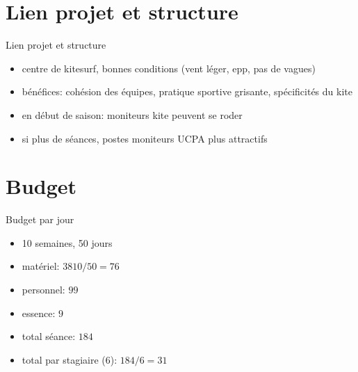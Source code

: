 \documentclass[10pt,a4paper]{beamer}
\begin{document}
\section{Lien projet et structure}
\begin{frame}{Lien projet et structure}
\begin{itemize}
\item  centre de kitesurf, bonnes conditions (vent léger, epp, pas de vagues)
\item bénéfices: cohésion des équipes, pratique sportive grisante, spécificités du kite
\item en début de saison:  moniteurs kite peuvent se roder
\item si plus de séances,  postes moniteurs UCPA plus attractifs
\end{itemize}
\end{frame}

\section{Budget}

\begin{frame}{Budget par jour}
\begin{itemize}
\item 10 semaines, 50 jours
\item matériel: $3810 / 50 = 76$
\item personnel: $99$
\item essence: $9$
\item total séance: $184$
\item total par stagiaire (6): $184/6 = 31$
\end{itemize}
\end{frame}
\end{document}
